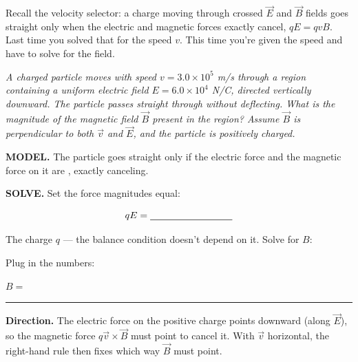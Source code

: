 \documentclass[12pt]{article}
\newcommand{\eqline}[2][-0.5mm]{%
  \par\vspace{1mm}\noindent #2\par\vspace{#1}%
  \noindent\textcolor{rulehue}{\rule{\linewidth}{0.5pt}}\par\vspace{4mm}%
}
\begin{document}



Recall the velocity selector: a charge moving through crossed
$\vec E$ and $\vec B$ fields goes straight only when the electric and
magnetic forces exactly cancel, $qE=qvB$. Last time you solved that
for the speed $v$. This time you're given the speed and have to solve
for the field.

\textit{A charged particle moves with speed $v=3.0\times10^5$ m/s
through a region containing a uniform electric field
$E=6.0\times10^4$ N/C, directed vertically downward. The particle
passes straight through without deflecting. What is the magnitude of
the magnetic field $\vec B$ present in the region? Assume $\vec B$ is
perpendicular to both $\vec v$ and $\vec E$, and the particle is
positively charged.}

\textbf{MODEL.} The particle goes straight only if the electric force
and the magnetic force on it are \bl[3cm], exactly canceling.

\textbf{SOLVE.} Set the force magnitudes equal:

\[
qE = \bl[3cm]
\]

The charge $q$ \bl[3cm] --- the balance condition doesn't depend on
it. Solve for $B$:


Plug in the numbers:

\eqline[0.2cm]{$B = $}

\textbf{Direction.} The electric force on the positive charge points
downward (along $\vec E$), so the magnetic force $q\vec v\times\vec B$
must point \bl[2.5cm] to cancel it. With $\vec v$ horizontal, the
right-hand rule then fixes which way $\vec B$ must point.

\end{document}
